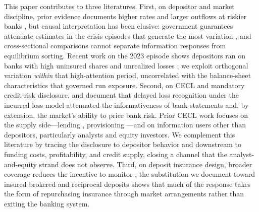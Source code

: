 This paper contributes to three literatures.  First, on depositor and
market discipline, prior evidence documents higher rates and larger
outflows at riskier banks \citep{park1995market, egan2017deposit,
flannery1996evidence, nier2006market}, but causal interpretation has
been elusive: government guarantees attenuate estimates in the crisis
episodes that generate the most variation \citep{bennett2015market,
berger2015depositors, jacewitz2018deposit}, and cross-sectional
comparisons cannot separate information responses from equilibrium
sorting.  Recent work on the 2023 episode shows depositors ran on banks
with high uninsured shares and unrealized losses
\citep{caglio2024depositors}; we exploit orthogonal variation
\emph{within} that high-attention period, uncorrelated with the
balance-sheet characteristics that governed run exposure.  Second, on
CECL and mandatory credit-risk disclosure, \citet{bushman2012accounting}
and \citet{bushman2015delayed} document that delayed loss recognition
under the incurred-loss model attenuated the informativeness of bank
statements and, by extension, the market's ability to price bank risk.
Prior CECL work focuses on the supply side---lending
\citep{granja2025current}, provisioning \citep{kim2026current}---and on
information users other than depositors, particularly analysts
\citep{gee2022decision} and equity investors.  We complement this
literature by tracing the disclosure to depositor behavior and
downstream to funding costs, profitability, and credit supply, closing
a channel that the analyst-and-equity strand does not observe.  Third,
on deposit insurance design, broader coverage reduces the incentive to
monitor \citep{demirgucc2004market, flannery2019market}; the substitution
we document toward insured brokered and reciprocal deposits
\citep{kim2024insurance} shows that much of the response takes the form
of repurchasing insurance through market arrangements rather than
exiting the banking system.
